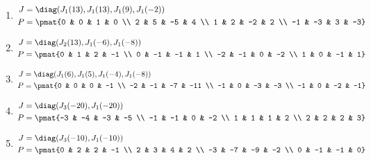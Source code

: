 \begin{enumerate}
\item

\begin{align*}
J &= \diag(J_{1}(13), J_{1}(13), J_{1}(9), J_{1}(-2))\\
P &= \pmat{0 & 0 & 1 & 0 \\ 2 & 5 & -5 & 4 \\ 1 & 2 & -2 & 2 \\ -1 & -3 & 3 & -3}
\end{align*}

\item

\begin{align*}
J &= \diag(J_{2}(13), J_{1}(-6), J_{1}(-8))\\
P &= \pmat{0 & 1 & 2 & -1 \\ 0 & -1 & -1 & 1 \\ -2 & -1 & 0 & -2 \\ 1 & 0 & -1 & 1}
\end{align*}

\item

\begin{align*}
J &= \diag(J_{1}(6), J_{1}(5), J_{1}(-4), J_{1}(-8))\\
P &= \pmat{0 & 0 & 0 & -1 \\ -2 & -1 & -7 & -11 \\ -1 & 0 & -3 & -3 \\ -1 & 0 & -2 & -1}
\end{align*}

\item

\begin{align*}
J &= \diag(J_{3}(-20), J_{1}(-20))\\
P &= \pmat{-3 & -4 & -3 & -5 \\ -1 & -1 & 0 & -2 \\ 1 & 1 & 1 & 2 \\ 2 & 2 & 2 & 3}
\end{align*}

\item

\begin{align*}
J &= \diag(J_{3}(-10), J_{1}(-10))\\
P &= \pmat{0 & 2 & 2 & -1 \\ 2 & 3 & 4 & 2 \\ -3 & -7 & -9 & -2 \\ 0 & -1 & -1 & 0}
\end{align*}


\end{enumerate}

